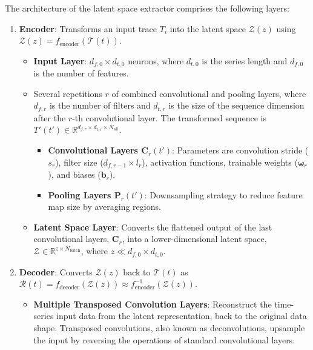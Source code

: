 The architecture of the latent space extractor comprises the following layers:
\begin{enumerate}
    \item \textbf{Encoder}: Transforms an input trace $T_i$ into the latent space $\mathcal{Z}(z)$ using $\mathcal{Z}(z) = f_{\text{encoder}}(\mathcal{T}(t))$.
    \begin{itemize}
        \item \textbf{Input Layer}: \(d_{f,0} \times d_{t,0}\) neurons, where \(d_{t,0}\) is the series length and \(d_{f,0}\) is the number of features.
        \item Several repetitions \(r\) of combined convolutional and pooling layers, where \(d_{f,r}\) is the number of filters and \(d_{t,r}\) is the size of the sequence dimension after the \(r\)-th convolutional layer. The transformed sequence is \(T'(t') \in \mathbb{R}^{d_{f,r} \times d_{t,r} \times N_{\text{all}}}\).
        \begin{itemize}
            \item \textbf{Convolutional Layers ${\boldsymbol{C}}_{r}(t')$}: Parameters are convolution stride ($s_r$), filter size ($d_{f,r-1} \times l_r$), activation functions, trainable weights ($\boldsymbol{\omega}_r$), and biases ($\boldsymbol{b}_r$).
            \item \textbf{Pooling Layers $\boldsymbol{P}_r(t')$}: Downsampling strategy to reduce feature map size by averaging regions.
        \end{itemize}
        \item \textbf{Latent Space Layer}: Converts the flattened output of the last convolutional layers, $\boldsymbol{C}_r$, into a lower-dimensional latent space, $\mathcal{Z} \in \mathbb{R}^{z \times N_{\text{batch}}}$, where $z \ll d_{f,0} \times d_{t, 0}$.
    \end{itemize}
    \item \textbf{Decoder}: Converts $\mathcal{Z}(z)$ back to $\mathcal{T}(t)$ as $\mathcal{R}(t) = f_{\text{decoder}}(\mathcal{Z}(z)) \approx f_{\text{encoder}}^{-1}(\mathcal{Z}(z))$.
        \begin{itemize}
            \item \textbf{Multiple Transposed Convolution Layers}: Reconstruct the time-series input data from the latent representation, back to the original data shape. Transposed convolutions, also known as deconvolutions, upsample the input by reversing the operations of standard convolutional layers.
        \end{itemize}
\end{enumerate}
